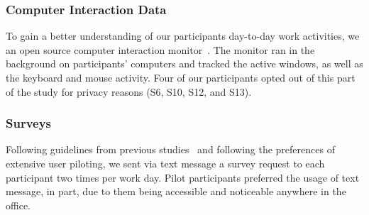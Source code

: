 \subsubsection{Computer Interaction Data}\label{sec:computer_interaction_data}
To gain a better understanding of our participants day-to-day work activities, we  an open source computer interaction monitor~\cite{Meyer17}. The monitor ran in the background on participants' computers and tracked the active windows, as well as the keyboard and mouse activity. Four of our participants opted out of this part of the study for privacy reasons (S6, S10, S12, and S13).

\subsubsection{Surveys}
\label{sec:Surveys}
Following guidelines from previous studies~\cite{Lalle16,Panwar18,Luo18} and 
following the preferences of extensive user piloting, we sent via 
text message a survey request to each participant two times per 
work day. Pilot participants preferred the usage of text message, in part, due 
to them being accessible and noticeable anywhere in the office. 

